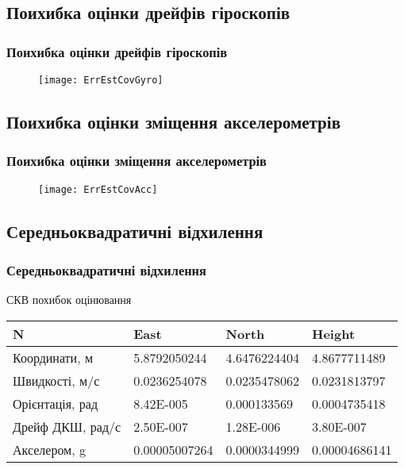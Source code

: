 \documentclass[ucs]{beamer}    %
\begin{document}
\subsection{Поихибка оцінки дрейфів гіроскопів} 
\begin{frame}%
\frametitle{Поихибка оцінки дрейфів гіроскопів}
\noindent
\begin{figure}
\texttt{[image: ErrEstCovGyro]}
\end{figure}
\end{frame}

\subsection{Поихибка оцінки зміщення акселерометрів} 
\begin{frame}%
\frametitle{Поихибка оцінки зміщення акселерометрів}
\begin{figure}
\centering
\texttt{[image: ErrEstCovAcc]}
\end{figure}
\end{frame}

\subsection{Середньоквадратичні відхилення}
\begin{frame}
\frametitle{Середньоквадратичні відхилення}
\begin{block}{СКВ похибок оцінювання}
\begin{table}%
\centering
\small
\begin{tabular}{|p{30mm}|p{20mm}|p{20mm}|p{20mm}|} \hline
N&East&North&Height \\ \hline
Координати, м & 5.8792050244& 4.6476224404& 4.8677711489 \\ \hline 
Швидкості, м/с& 0.0236254078& 0.0235478062& 0.0231813797 \\ \hline 
Орієнтація, рад& 8.42E-005& 0.000133569& 0.0004735418 \\ \hline 
Дрейф ДКШ, рад/с& 2.50E-007& 1.28E-006 & 3.80E-007 \\ \hline 
Акселером, g & 0.00005007264& 0.0000344999 & 0.00004686141 \\ \hline 
\end{tabular}
\label{tab:results}
\end{table}
\end{block}
\end{frame}
\end{document}
